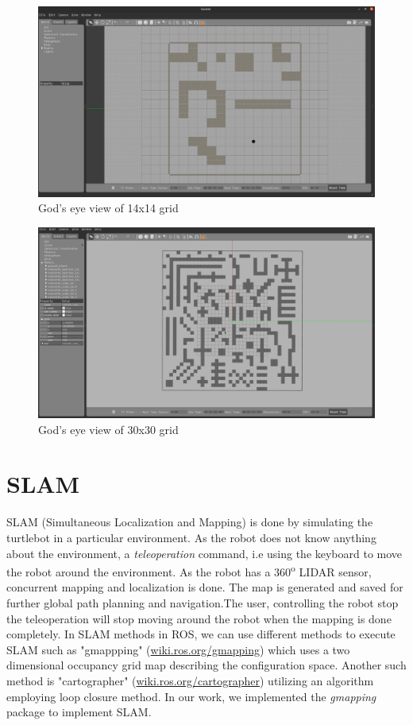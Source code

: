 \begin{figure}[th]
    \centering
    \includegraphics[width=\textwidth]{Figures/base_god_eye_world.png}
    \decoRule
    \caption[]{God's eye view of 14x14 grid}
    \label{fig:14x14grid}
\end{figure}

\begin{figure}[th]
    \centering
    \includegraphics[width=\textwidth]{Figures/30_30_god_eye_world.png}
    \decoRule
    \caption[]{God's eye view of 30x30 grid}
    \label{fig:30x30grid}
\end{figure}

\section{SLAM}
SLAM (Simultaneous Localization and Mapping) is done by simulating the turtlebot in a particular environment. 
As the robot does not know anything about the environment, a \textit{teleoperation} command, i.e using the keyboard
to move the robot around the environment. As the robot has a 360\textsuperscript{o} LIDAR sensor, concurrent mapping 
and localization is done. The map is generated and saved for further global path planning and navigation.The user, controlling the 
robot stop the teleoperation will stop moving around the robot when the mapping is done completely.
In SLAM methods in ROS, we can use different methods to execute SLAM such as "gmappping" (\url{wiki.ros.org/gmapping}) which uses a two
dimensional occupancy grid map describing the configuration space. Another such method is "cartographer" (\url{wiki.ros.org/cartographer})
utilizing an algorithm employing loop closure method. In our work, we implemented the \textit{gmapping} package to implement SLAM.

